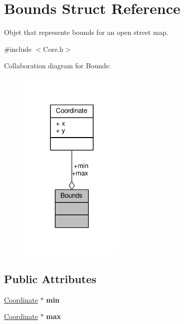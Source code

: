 \hypertarget{structBounds}{\section{Bounds Struct Reference}
\label{structBounds}
}


Objet that represente bounds for an open street map.  




{\ttfamily \#include $<$Core.\-h$>$}



Collaboration diagram for Bounds\-:
\nopagebreak
\begin{figure}[H]
\begin{center}
\leavevmode
\includegraphics[width=144pt]{structBounds__coll__graph}
\end{center}
\end{figure}
\subsection*{Public Attributes}
\begin{DoxyCompactItemize}
\item 
\hypertarget{structBounds_a1c9164048f1f4c69c95fe140ade0b356}{\hyperlink{structCoordinate}{Coordinate} $\ast$ {\bfseries min}}\label{structBounds_a1c9164048f1f4c69c95fe140ade0b356}

\item 
\hypertarget{structBounds_a78e28f17202532fe18c6d05cc155c791}{\hyperlink{structCoordinate}{Coordinate} $\ast$ {\bfseries max}}\label{structBounds_a78e28f17202532fe18c6d05cc155c791}

\end{DoxyCompactItemize}


